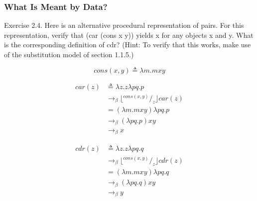             \subsubsection{What Is Meant by Data?}

Exercise 2.4. Here is an alternative procedural representation of pairs. For this representation, verify that (car (cons x y)) yields x for any objects x and y.  What is the corresponding definition of cdr? (Hint: To verify that this works, make use of the substitution model of section 1.1.5.) 

\begin{equation}
cons\left(x,y\right) \triangleq \lambda m . m x y
\label{eq:church_pair}
\end{equation}
\newline

\begin{equation}
\begin{split}
car\left(z\right) & \triangleq \lambda z . z \lambda p q . p \\
& \to_\beta \lfloor{ ^{cons\left(x,y\right)} / _{z} \rfloor} car\left(z\right)  \\
& = \left( \lambda m . m x y \right) \lambda p q . p \\
& \to_\beta \left( \lambda p q . p \right) x y  \\
& \to_\beta x
\end{split}
\label{eq:church_car}
\end{equation}
\newline

\begin{equation}
\begin{split}
cdr\left(z\right) & \triangleq \lambda z . z \lambda p q . q \\
& \to_\beta \lfloor{ ^{cons\left(x,y\right)} / _{z} \rfloor} cdr\left(z\right)  \\
& = \left( \lambda m . m x y \right) \lambda p q . q \\
& \to_\beta \left( \lambda p q . q \right) x y  \\
& \to_\beta y
\end{split}
\label{eq:church_cdr}
\end{equation}
\newline
% 

